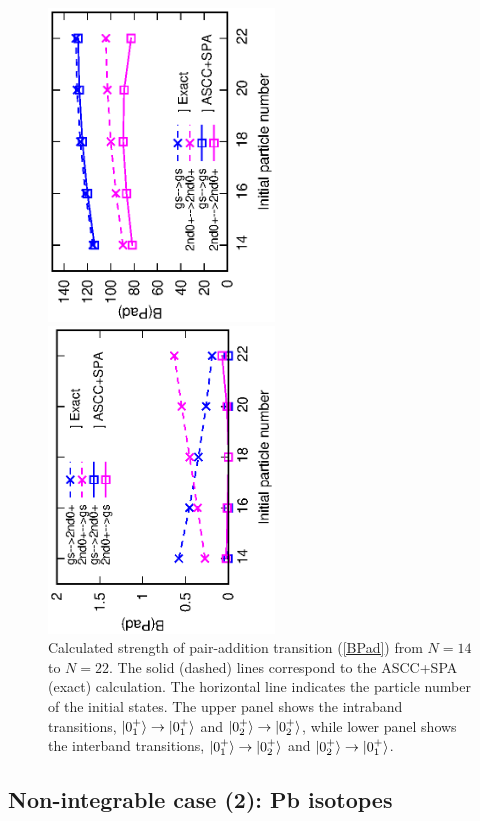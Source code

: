 \documentclass[%
superscriptaddress,
showpacs,
nofootinbib,
amsmath,amssymb,
aps,
prc,
twocolumn,
floatfix ]%
{revtex4-1}
\begin{document}
\begin{figure}[htbp]
 \begin{center}
  \includegraphics[width=60mm,angle=-90]{intra_trans.eps}
 \end{center}
 \begin{center}
  \includegraphics[width=60mm,angle=-90]{inter_trans.eps}
 \end{center}
\caption{Calculated strength of pair-addition transition (\ref{BPad})
from $N=14$ to $N=22$. 
The solid (dashed) lines correspond to the ASCC+SPA (exact) calculation.
The horizontal line indicates the particle number of the initial states.
The upper panel shows the intraband transitions,
$\ket{0_1^+}\to\ket{0_1^+}$ and $\ket{0_2^+}\to\ket{0_2^+}$,
while lower panel shows the interband transitions,
$\ket{0_1^+}\to\ket{0_2^+}$ and $\ket{0_2^+}\to\ket{0_1^+}$.
}
 \label{3levelPad}
\end{figure}




\subsection{Non-integrable case (2): Pb isotopes}
\label{sec:Pb_isotopes}
\end{document}
